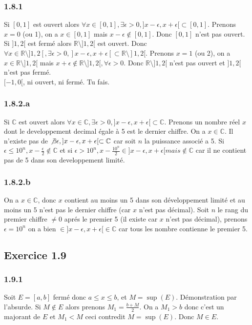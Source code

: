 \documentclass[]{book}
\theoremstyle{definition}
\newcommand{\bb}[1]{\mathbb{#1}}
\newcommand{\R}{\bb{R}}
\newcommand{\C}{\bb{C}}
\begin{document}
\subsubsection*{1.8.1}
Si $[0,1]$ est ouvert alors $\forall x \in [0,1], \exists \epsilon > 0, ]x-\epsilon, x+\epsilon[ \subset [0,1]$. Prenons $x = 0$ (ou 1), on a $x \in [0,1]$ mais 
$x-\epsilon \notin [0,1]$. Donc $[0,1]$ n'est pas ouvert.\\

Si $]1,2[$ est ferm\'e alors $\R \setminus ]1,2[$ est ouvert. Donc $\forall x \in \R \setminus ]1,2[, \exists \epsilon > 0, ]x-\epsilon, x+\epsilon[ \subset \R \setminus ]1,2[$. Prenons $x = 1$ (ou 2), on a $x \in \R \setminus ]1,2[$ mais $x+\epsilon \notin \R \setminus ]1,2[, \forall \epsilon >0$. Donc $\R \setminus ]1,2[$ n'est pas ouvert et $]1,2[$ n'est pas ferm\'e.\\

$[-1,0[$, ni ouvert, ni ferm\'e. Tu fais.

\subsubsection*{1.8.2.a}
Si $\C$ est ouvert alors $\forall x \in \C, \exists \epsilon > 0, ]x-\epsilon, x+\epsilon[ \subset \C$. Prenons un nombre r\'eel $x$ dont le developpement decimal \'egale \`a 5 est le dernier chiffre. On a $x \in \C$. Il n'existe pas de $\not\exists \epsilon, ]x-\epsilon, x+\epsilon[ \subset \C$ car soit $n$ la puissance associ\'e a 5. Si $\epsilon \leq 10^{n}, x-\frac{\epsilon}{2} \notin \C$ et si $\epsilon > 10^{n}, x-\frac{10^{n}}{2} \in ]x-\epsilon,x+\epsilon[ mais \notin \C$ car il ne contient pas de 5 dans son developpement limit\'e.

\subsubsection*{1.8.2.b}
On a $x \in \C$, donc $x$ contient au moins un 5 dans son d\'eveloppement limit\'e et au moins un 5 n'est pas le dernier chiffre (car $x$ n'est pas d\'ecimal). Soit $n$ le rang du premier chiffre $\neq 0$ apr\'es le premier 5 (il existe car $x$ n'est pas d\'ecimal), prenons $\epsilon = 10^{n}$  on a bien $\in ]x-\epsilon,x+\epsilon[ \in \C$ car tous les nombre contienne le premier 5.


\subsection*{Exercice 1.9}
\subsubsection*{1.9.1}
Soit $E = [a,b]$ ferm\'e donc $a \leq x \leq b$, et $M = \sup(E)$. D\'emonstration par l'absurde. Si $M \not\in E$ alors prenons $M_1 = \frac{b+M}{2}$. On a $M_1 > b$ donc c'est un majorant de $E$ et $M_1 < M$ ceci contredit $M=\sup(E)$. Donc $M \in E$.  
\end{document}
